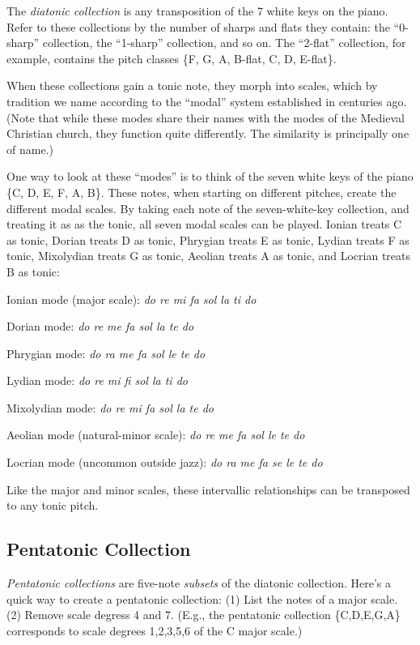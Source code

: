 \documentclass{book}
\begin{document}
The \emph{diatonic collection} is any transposition of the 7 white keys on the
piano. Refer to these collections by the number of sharps and flats they
contain: the ``0-sharp'' collection, the ``1-sharp'' collection, and so on.
The ``2-flat'' collection, for example, contains the pitch classes \{F, G, A,
B-flat, C, D, E-flat\}.

When these collections gain a tonic note, they morph into scales, which by
tradition we name according to the ``modal'' system established in centuries
ago. (Note that while these modes share their names with the modes of the
Medieval Christian church, they function quite differently. The similarity is
principally one of name.)

One way to look at these ``modes'' is to think of the seven white keys of the
piano \{C, D, E, F, A, B\}. These notes, when starting on different pitches,
create the different modal scales. By taking each note of the seven-white-key
collection, and treating it as as the tonic, all seven modal scales can be
played. Ionian treats C as tonic, Dorian treats D as tonic, Phrygian treats E
as tonic, Lydian treats F as tonic, Mixolydian treats G as tonic, Aeolian
treats A as tonic, and Locrian treats B as tonic:

Ionian mode (major scale): \emph{do re mi fa sol la ti do}

Dorian mode: \emph{do re me fa sol la te do}

Phrygian mode: \emph{do ra me fa sol le te do}

Lydian mode: \emph{do re mi fi sol la ti do}

Mixolydian mode: \emph{do re mi fa sol la te do}

Aeolian mode (natural-minor scale): \emph{do re me fa sol le te do}

Locrian mode (uncommon outside jazz): \emph{do ra me fa se le te do}

Like the major and minor scales, these intervallic relationships can be
transposed to any tonic pitch.

\hypertarget{pentatonic-collection}{%
\subsection{Pentatonic Collection}\label{pentatonic-collection}}

\emph{Pentatonic collections} are five-note \emph{subsets} of the diatonic
collection. Here's a quick way to create a pentatonic collection: (1) List the
notes of a major scale. (2) Remove scale degress 4 and 7. (E.g., the
pentatonic collection \{C,D,E,G,A\} corresponds to scale degrees 1,2,3,5,6 of
the C major scale.)
\end{document}
